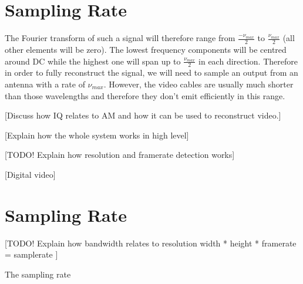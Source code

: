 \documentclass[a4paper,12pt,twoside,openright]{report}
\begin{document}
\section{Sampling Rate}

The Fourier transform of such a signal will therefore range from $\frac{-\nu_{max}}{2}$ to $\frac{\nu_{max}}{2}$ (all other elements will be zero). The lowest frequency components will be centred around DC while the highest one will span up to $\frac{\nu_{max}}{2}$ in each direction. Therefore in order to fully reconstruct the signal, we will need to sample an output from an antenna with a rate of $\nu_{max}$. However, the video cables are usually much shorter than those wavelengths and therefore they don't emit efficiently in this range. 

[Discuss how IQ relates to AM and how it can be used to reconstruct video.]

[Explain how the whole system works in high level]

[TODO! Explain how resolution and framerate detection works]

[Digital video]

\section{Sampling Rate}

[TODO! Explain how bandwidth relates to resolution width * height * framerate = samplerate ]

The sampling rate
\end{document}
